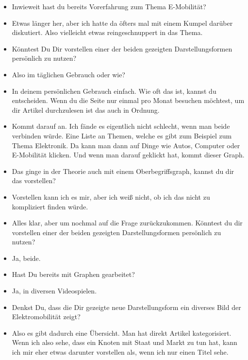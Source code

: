 {\begin{itemize}[]
        \item {} Inwieweit hast du bereits Vorerfahrung zum Thema E-Mobilität?
        \item {} Etwas länger her, aber ich hatte da öfters mal mit einem Kumpel darüber diskutiert.
              Also vielleicht etwas reingeschnuppert in das Thema.
        \item {} Könntest Du Dir vorstellen einer der beiden gezeigten Darstellungsformen persönlich zu nutzen?
        \item {} Also im täglichen Gebrauch oder wie?
        \item {} In deinem persönlichen Gebrauch einfach.
              Wie oft das ist, kannst du entscheiden.
              Wenn du die Seite nur einmal pro Monat besuchen möchtest, um dir Artikel durchzulesen ist das auch in Ordnung.
        \item {} Kommt darauf an. Ich fände es eigentlich nicht schlecht, wenn man beide verbinden würde.
              Eine Liste an Themen, welche es gibt zum Beispiel zum Thema Elektronik.
              Da kann man dann auf Dinge wie Autos, Computer oder E-Mobilität klicken.
              Und wenn man darauf geklickt hat, kommt dieser Graph.
        \item {} Das ginge in der Theorie auch mit einem Oberbegriffsgraph, kannst du dir das vorstellen?
        \item {} Vorstellen kann ich es mir, aber ich weiß nicht, ob ich das nicht zu kompliziert finden würde.
        \item {} Alles klar, aber um nochmal auf die Frage zurückzukommen.
              Könntest du dir vorstellen einer der beiden gezeigten Darstellungsformen persönlich zu nutzen?
        \item {} Ja, beide.
        \item {} Hast Du bereits mit Graphen gearbeitet?
        \item {} Ja, in diversen Videospielen.
        \item {} Denkst Du, dass die Dir gezeigte neue Darstellungsform ein diverses Bild der Elektromobilität zeigt?
        \item {} Also es gibt dadurch eine Übersicht.
              Man hat direkt Artikel kategorisiert.
              Wenn ich also sehe, dass ein Knoten mit Staat und Markt zu tun hat, kann ich mir eher etwas darunter vorstellen als, wenn ich nur einen Titel sehe.

\end{itemize}}
